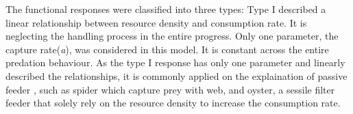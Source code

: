 \documentclass[11pt, a4paper]{article}
\begin{document}
The functional responses were classified into three types: Type I described a linear relationship between resource density and consumption rate. It is neglecting the handling process in the entire progress. Only one parameter, the capture rate(\textit{a}), was considered in this model. It is constant across the entire predation behaviour. As the type I response has only one parameter and linearly described the relationships, it is commonly applied on the explaination of passive feeder \cite{Jeschke2004}, such as spider which capture prey with web, and oyster, a sessile filter feeder that solely rely on the resource density to increase the  consumption rate. 



\end{document}
